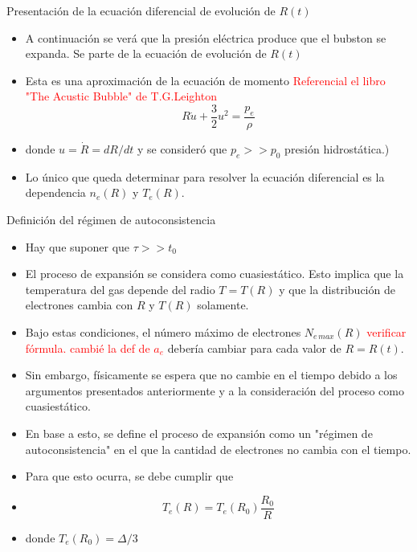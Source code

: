 \documentclass[aps,prb,twocolumn,superscriptaddress,floatfix,longbibliography,10pt]{revtex4-2}
\newcounter{para}
\begin{document}
Presentación de la ecuación diferencial de evolución de $R(t)$
\begin{itemize}
  \item A continuación se verá que la presión eléctrica produce que el bubston se expanda. Se parte de la ecuación de evolución de $R(t)$
  \item Esta es una aproximación de la ecuación de momento \textcolor{red}{Referencial el libro "The Acustic Bubble" de T.G.Leighton}
  \begin{equation}
    R \dot{u} + \frac{3}{2}u^2 = \frac{p_e}{\rho}
    \label{eq:bubston_ec_dif_R}
  \end{equation}
    \item donde $u = \dot{R} = dR/dt$ y se consideró que $p_e >> p_0$ presión hidrostática.)
  \item Lo único que queda determinar para resolver la ecuación diferencial es la dependencia $n_e(R)$ y $T_e(R)$.
\end{itemize}


Definición del régimen de autoconsistencia
\begin{itemize}
  \item Hay que suponer que $\tau >> t_0$
  \item El proceso de expansión se considera como cuasiestático. Esto implica que la temperatura del gas depende del radio $T = T(R)$ y que la distribución de electrones cambia con $R$ y $T(R)$ solamente.
  \item Bajo estas condiciones, el número máximo de electrones $N_{e \, max}(R)$ \textcolor{red}{verificar fórmula. cambié la def de $a_e$} debería cambiar para cada valor de $R = R(t)$.
  \item Sin embargo, físicamente se espera que no cambie en el tiempo debido a los argumentos presentados anteriormente y a la consideración del proceso como cuasiestático.
  \item En base a esto, se define el proceso de expansión como un "régimen de autoconsistencia" en el que la cantidad de electrones no cambia con el tiempo.
  \item Para que esto ocurra, se debe cumplir que
  \item \[T_e(R) = T_e(R_0)\frac{R_0}{R} \]
  \item donde $T_e(R_0) = \Delta/3$
\end{itemize}
\end{document}
